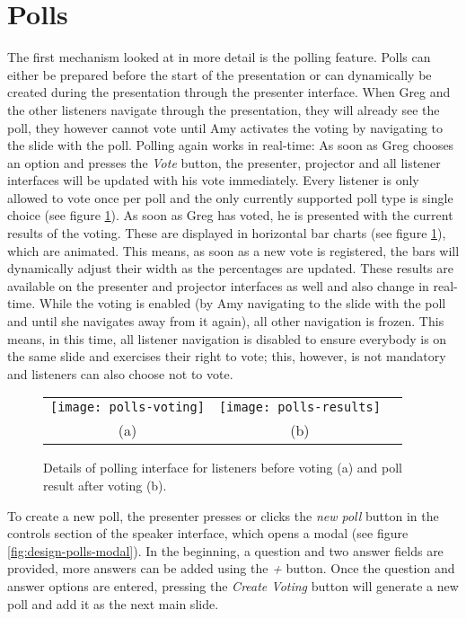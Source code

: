 \section{Polls}
The first mechanism looked at in more detail is the polling feature. Polls can either be prepared before the start of the presentation or can dynamically be created during the presentation through the presenter interface. When Greg and the other listeners navigate through the presentation, they will already see the poll, they however cannot vote until Amy activates the voting by navigating to the slide with the poll. Polling again works in real-time: As soon as Greg chooses an option and presses the \emph{Vote} button, the presenter, projector and all listener interfaces will be updated with his vote immediately. Every listener is only allowed to vote once per poll and the only currently supported poll type is single choice (see figure \ref{fig:design-polls}). As soon as Greg has voted, he is presented with the current results of the voting. These are displayed in horizontal bar charts (see figure \ref{fig:design-polls}), which are animated. This means, as soon as a new vote is registered, the bars will dynamically adjust their width as the percentages are updated. These results are available on the presenter and projector interfaces as well and also change in real-time.
While the voting is enabled (by Amy navigating to the slide with the poll and until she navigates away from it again), all other navigation is frozen. This means, in this time, all listener navigation is disabled to ensure everybody is on the same slide and exercises their right to vote; this, however, is not mandatory and listeners can also choose not to vote.

\begin{figure}
\centering
\begin{tabular}{ccc}
\texttt{[image: polls-voting]} &
\texttt{[image: polls-results]} \\
(a) & (b)
\end{tabular}
\caption{Details of polling interface for listeners before voting (a) and poll result after voting (b).}
\label{fig:design-polls}
\end{figure}

To create a new poll, the presenter presses or clicks the \emph{new poll} button in the controls section of the speaker interface, which opens a modal (see figure \ref{fig:design-polls-modal}). In the beginning, a question and two answer fields are provided, more answers can be added using the \emph{+} button. Once the question and answer options are entered, pressing the \emph{Create Voting} button will generate a new poll and add it as the next main slide.

